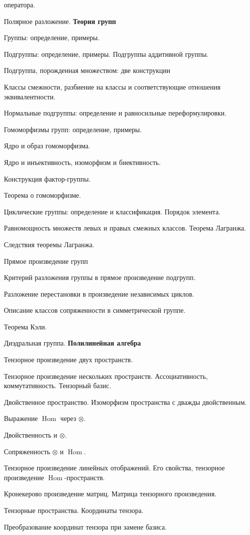\documentclass[12pt]{article}
\DeclareMathOperator{\Hom}{Hom}
\newcommand\glava[1]{{\bf\hfill #1}}
\begin{document}
\begin{compactenum}
  оператора.
\item Полярное разложение.
\glava{Теория групп}
\item Группы: определение, примеры.
\item Подгруппы: определение, примеры. Подгруппы аддитивной группы.
\item Подгруппа, порожденная множеством: две конструкции
\item Классы смежности, разбиение на классы и соответствующие
  отношения эквивалентности.
\item Нормальные подгруппы: определение и равносильные
  переформулировки.
\item Гомоморфизмы групп: определение, примеры.
\item Ядро и образ гомоморфизма.
\item Ядро и инъективность, изоморфизм и биективность.
\item Конструкция фактор-группы.
\item Теорема о гомоморфизме.
\item Циклические группы: определение и классификация. Порядок
  элемента.
\item Равномощность множеств левых и правых смежных классов. Теорема
  Лагранжа.
\item Следствия теоремы Лагранжа.
\item Прямое произведение групп
\item Критерий разложения группы в прямое произведение подгрупп.
\item Разложение перестановки в произведение независимых циклов.
\item Описание классов сопряженности в симметрической группе.
\item Теорема Кэли.
\item Диэдральная группа.
\glava{Полилинейная алгебра}
\item Тензорное произведение двух пространств.
\item Тензорное произведение нескольких пространств. Ассоциативность,
  коммутативность. Тензорный базис.
\item Двойственное пространство. Изоморфизм пространства с дважды
  двойственным.
\item Выражение $\Hom$ через $\otimes$.
\item Двойственность и $\otimes$.
\item Сопряженность $\otimes$ и $\Hom$.
\item Тензорное произведение линейных отображений. Его свойства,
  тензорное произведение $\Hom$-пространств.
\item Кронекерово произведение матриц. Матрица тензорного
  произведения.
\item Тензорные пространства. Координаты тензора.
\item Преобразование координат тензора при замене базиса.
\end{compactenum}
\end{document}
